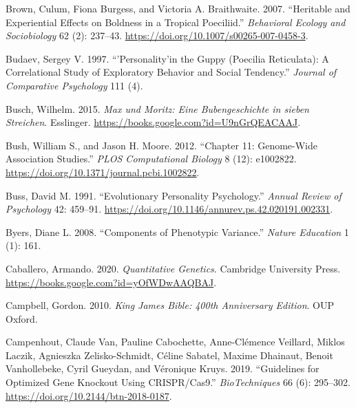 \documentclass[
]{book}
\newlength{\cslhangindent}
\newlength{\cslentryspacingunit} %
\newenvironment{CSLReferences}[2] %
 {%
  \setlength{\parindent}{0pt}
  \ifodd #1
  \let\oldpar\par
  \def\par{\hangindent=\cslhangindent\oldpar}
  \fi
  \setlength{\parskip}{#2\cslentryspacingunit}
 }%
 {}
\begin{document}
\begin{CSLReferences}{1}{0}
\leavevmode{}%
Brown, Culum, Fiona Burgess, and Victoria A. Braithwaite. 2007. {``Heritable and Experiential Effects on Boldness in a Tropical Poeciliid.''} \emph{Behavioral Ecology and Sociobiology} 62 (2): 237--43. \url{https://doi.org/10.1007/s00265-007-0458-3}.

\leavevmode{}%
Budaev, Sergey V. 1997. {``'{Personality}'in the Guppy ({Poecilia} Reticulata): {A} Correlational Study of Exploratory Behavior and Social Tendency.''} \emph{Journal of Comparative Psychology} 111 (4).

\leavevmode{}%
Busch, Wilhelm. 2015. \emph{Max und Moritz: Eine Bubengeschichte in sieben Streichen}. {Esslinger}. \url{https://books.google.com?id=U9nGrQEACAAJ}.

\leavevmode{}%
Bush, William S., and Jason H. Moore. 2012. {``Chapter 11: {Genome-Wide Association Studies}.''} \emph{PLOS Computational Biology} 8 (12): e1002822. \url{https://doi.org/10.1371/journal.pcbi.1002822}.

\leavevmode{}%
Buss, David M. 1991. {``Evolutionary Personality Psychology.''} \emph{Annual Review of Psychology} 42: 459--91. \url{https://doi.org/10.1146/annurev.ps.42.020191.002331}.

\leavevmode{}%
Byers, Diane L. 2008. {``Components of Phenotypic Variance.''} \emph{Nature Education} 1 (1): 161.

\leavevmode{}%
Caballero, Armando. 2020. \emph{Quantitative {Genetics}}. {Cambridge University Press}. \url{https://books.google.com?id=yOfWDwAAQBAJ}.

\leavevmode{}%
Campbell, Gordon. 2010. \emph{King {James Bible}: 400th {Anniversary Edition}}. {OUP Oxford}.

\leavevmode{}%
Campenhout, Claude Van, Pauline Cabochette, Anne-Clémence Veillard, Miklos Laczik, Agnieszka Zelisko-Schmidt, Céline Sabatel, Maxime Dhainaut, Benoit Vanhollebeke, Cyril Gueydan, and Véronique Kruys. 2019. {``Guidelines for Optimized Gene Knockout Using {CRISPR}/{Cas9}.''} \emph{BioTechniques} 66 (6): 295--302. \url{https://doi.org/10.2144/btn-2018-0187}.


\end{CSLReferences}
\end{document}
